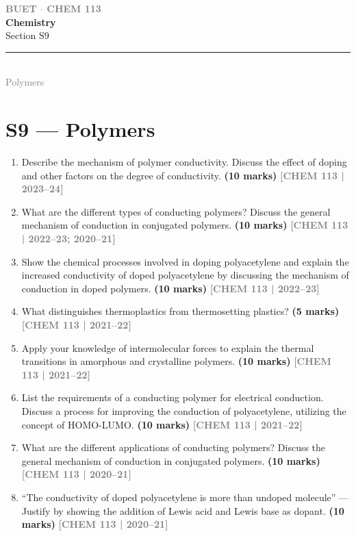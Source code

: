 \documentclass[12pt,a3paper]{article}
\newcommand{\yr}[1]{\hfill\textcolor{gray}{\small\textbf{[#1]}}}
\newcommand{\mk}[1]{\textcolor{orange!70!black}{\small\textbf{(#1 marks)}}}
\newcommand{\secdivider}[4]{%
  \newpage\thispagestyle{empty}%
  \vspace*{\fill}%
  \begin{tcolorbox}[enhanced,colback=#4!7,colframe=#3,boxrule=1.5pt,arc=8pt,
    left=20pt,right=20pt,top=22pt,bottom=22pt,
    shadow={3pt}{-3pt}{0pt}{black!15}]
    \centering
    {\large\textcolor{gray}{\textbf{BUET $\cdot$ CHEM 113}}}\\[8pt]
    {\fontsize{26}{32}\selectfont\bfseries\textcolor{#3}{Chemistry}}\\[6pt]
    {\fontsize{15}{19}\selectfont\textcolor{dgray}{#1}}\\[12pt]
    \textcolor{#3!60}{\rule{0.5\textwidth}{0.5pt}}\\[6pt]
    {\small\textcolor{gray}{#2}}
  \end{tcolorbox}%
  \vspace*{\fill}\newpage%
}
\begin{document}
\newpage


\secdivider{Section S9}{Polymers}{cB}{cB}
\label{sec:S9}
\section{S9 --- Polymers}

\begin{enumerate}
\item Describe the mechanism of polymer conductivity. Discuss the effect of doping and other factors on the degree of conductivity. \mk{10}
\yr{CHEM 113 | 2023--24}





\item What are the different types of conducting polymers? Discuss the general mechanism of conduction in conjugated polymers. \mk{10}
\yr{CHEM 113 | 2022--23; 2020--21}



\item Show the chemical processes involved in doping polyacetylene and explain the increased conductivity of doped polyacetylene by discussing the mechanism of conduction in doped polymers. \mk{10}
\yr{CHEM 113 | 2022--23}



\item What distinguishes thermoplastics from thermosetting plastics? \mk{5}
\yr{CHEM 113 | 2021--22}



\item Apply your knowledge of intermolecular forces to explain the thermal transitions in amorphous and crystalline polymers. \mk{10}
\yr{CHEM 113 | 2021--22}



\item List the requirements of a conducting polymer for electrical conduction. Discuss a process for improving the conduction of polyacetylene, utilizing the concept of HOMO-LUMO. \mk{10}
\yr{CHEM 113 | 2021--22}



\item What are the different applications of conducting polymers? Discuss the general mechanism of conduction in conjugated polymers. \mk{10}
\yr{CHEM 113 | 2020--21}



\item ``The conductivity of doped polyacetylene is more than undoped molecule'' --- Justify by showing the addition of Lewis acid and Lewis base as dopant. \mk{10}
\yr{CHEM 113 | 2020--21}




\end{enumerate}
\end{document}

